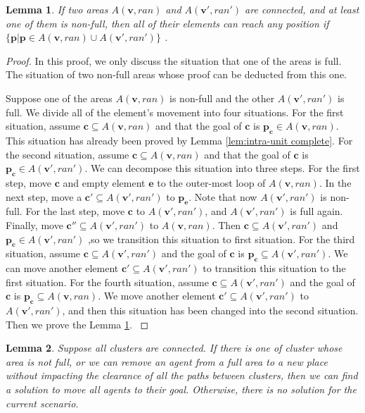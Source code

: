 \documentclass[letterpaper]{article}
\newtheorem{lemma}{Lemma}
\theoremstyle{definition}
\theoremstyle{plain}
\theoremstyle{definition}
\theoremstyle{remark}
\begin{document}
\begin{lemma}
If two areas $A(\mathbf v, ran)$ and $A(\mathbf v', ran')$ are connected, and at least one of them is non-full, then all of their elements can reach any position if $\{\mathbf{p}| \mathbf{p} \in A(\mathbf v, ran) \cup A(\mathbf v', ran')\}$ .
\label{lem:intertcluster}
\end{lemma}
\begin{proof}
In this proof, we only discuss the situation that one of the areas is full. The situation of two non-full areas whose proof can be deducted from this one.

Suppose one of the areas $A(\mathbf v,ran)$ is non-full and the other $A(\mathbf v',ran')$ is full. We divide all of the element's movement into four situations. 
For the first situation, assume $\mathbf{c} \subseteq A(\mathbf v,ran)$ and that the goal of $\mathbf{c}$ is $\mathbf{p_c} \in A(\mathbf v,ran)$. This situation has already been proved by Lemma \ref{lem:intra-unit complete}.
For the second situation, assume $\mathbf{c} \subseteq A(\mathbf v,ran)$ and that the goal of $\mathbf{c}$ is $\mathbf{p_c} \in A(\mathbf v',ran')$.
We can decompose this situation into three steps. For the first step, move $\mathbf{c}$ and empty element $\mathbf{e}$ to the outer-most loop of  $A(\mathbf v,ran)$. In the next step, move a $\mathbf{c'} \subseteq A(\mathbf v',ran')$ to $\mathbf{p_e}$. Note that now $A(\mathbf v',ran')$ is non-full. For the last step, move $\mathbf{c}$ to $A(\mathbf v',ran')$, and $A(\mathbf v',ran')$ is full again. Finally, move $\mathbf{c''} \subseteq A(\mathbf v',ran')$ to $A(\mathbf v,ran)$. Then  $\mathbf{c} \subseteq A(\mathbf v',ran')$ and $\mathbf{p_c} \in A(\mathbf v',ran')$ ,so we transition this situation to first situation. 
For the third situation, assume $\mathbf{c} \subseteq A(\mathbf v',ran')$ and the goal of $\mathbf{c}$ is $\mathbf{p_c} \subseteq A(\mathbf v',ran')$. We can move another element $\mathbf{c'} \subseteq A(\mathbf v',ran')$ to transition this situation to the first situation.
For the fourth situation, assume $\mathbf{c} \subseteq A(\mathbf v',ran')$ and the goal of $\mathbf{c}$ is $\mathbf{p_c} \subseteq A(\mathbf v,ran)$. We move another element $\mathbf{c'} \subseteq A(\mathbf v',ran')$ to $A(\mathbf v',ran')$, and then this situation has been changed into the second situation. Then we prove the Lemma \ref{lem:intertcluster}.
\label{proof:intertcluster}
\end{proof}

\begin{lemma}
Suppose all clusters are connected. If there is one of cluster whose area is not full, or we can remove an agent from a full area to a new place without impacting the clearance of all the paths between clusters, then we can find a solution to move all agents to their goal. Otherwise, there is no solution for the current scenario.
\label{lem:complete}
\end{lemma}
\end{document}
